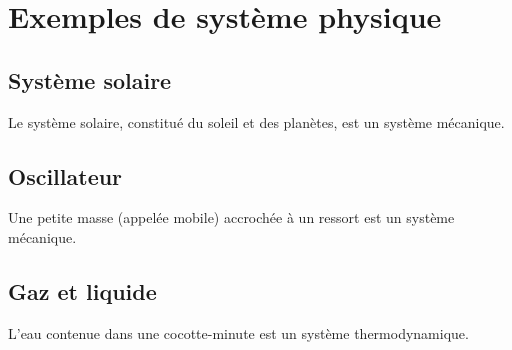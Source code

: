 \section{Exemples de système physique}

\subsection{Système solaire}

Le système solaire, constitué du soleil et des planètes, est un système mécanique.

\subsection{Oscillateur}

Une petite masse (appelée mobile) accrochée à un ressort est un système mécanique.

\begin{center}

\end{center}


\subsection{Gaz et liquide}

L'eau contenue dans une cocotte-minute est un système thermodynamique.


